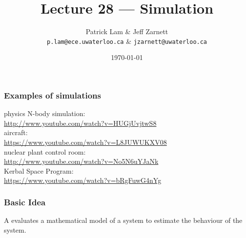 
\usepackage{tikz-3dplot}

\title{Lecture 28 --- Simulation}

\author{Patrick Lam \& Jeff Zarnett \\ \small \texttt{p.lam@ece.uwaterloo.ca} \& \texttt{jzarnett@uwaterloo.ca}}
\date{\today}



\begin{frame}
  \titlepage
\end{frame}

\begin{frame}
\frametitle{Examples of simulations}

\begin{changemargin}{1cm}
physics N-body simulation:\\
\url{http://www.youtube.com/watch?v=HUGjUvjtwS8} \\[1em]

aircraft:\\
\url{https://www.youtube.com/watch?v=L8JUWUKXV08} \\[1em]

nuclear plant control room:\\
\url{http://www.youtube.com/watch?v=No5N6uYJaNk} \\[1em]

Kerbal Space Program:\\
\url{https://www.youtube.com/watch?v=bRgFuwG4nYg}

\end{changemargin}

\end{frame}

\begin{frame}
\frametitle{Basic Idea}

\begin{changemargin}{1cm}
\huge

A  evaluates a mathematical model of a system
to estimate the behaviour of the system.

\end{changemargin}

\end{frame}

